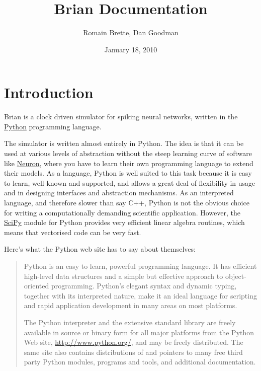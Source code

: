 \documentclass[letterpaper,10pt,english]{manual}
\title{Brian Documentation}
\date{January 18, 2010}
\author{Romain Brette, Dan Goodman}
\begin{document}
\maketitle
\tableofcontents
\hypertarget{--doc-index}{}

\hypertarget{module-brian}{}
\resetcurrentobjects
\hypertarget{--doc-introduction}{}

\chapter{Introduction}

Brian is a clock driven simulator for spiking neural networks, written in the \href{http://www.python.org}{Python} programming language.

The simulator is written almost entirely in Python. The idea is that
it can be used at various levels
of abstraction without the steep learning curve of software like \href{http://www.neuron.yale.edu/neuron/}{Neuron}, where you have to learn their
own programming language to extend their models. As a language, Python is well suited to this task
because it is easy to learn, well known and supported, and allows a great deal of flexibility in usage
and in designing interfaces and abstraction mechanisms. As an interpreted language, and therefore slower
than say C++, Python is not the obvious choice for writing a computationally demanding scientific
application. However, the \href{http://www.scipy.org/}{SciPy} module for Python provides very efficient linear algebra routines, which
means that vectorised code can be very fast.

Here's what the Python web site has to say about themselves:
\begin{quote}

Python is an easy to learn, powerful programming language. It has efficient
high-level data structures and a simple but effective approach to
object-oriented programming. Python's elegant syntax and dynamic typing,
together with its interpreted nature, make it an ideal language for
scripting and rapid application development in many areas on most platforms.

The Python interpreter and the extensive standard library are freely
available in source or binary form for all major platforms from the
Python Web site, \href{http://www.python.org/}{http://www.python.org/}, and may be freely distributed.
The same site also contains distributions of and pointers to many free
third party Python modules, programs and tools, and additional documentation.
\end{quote}
\end{document}
